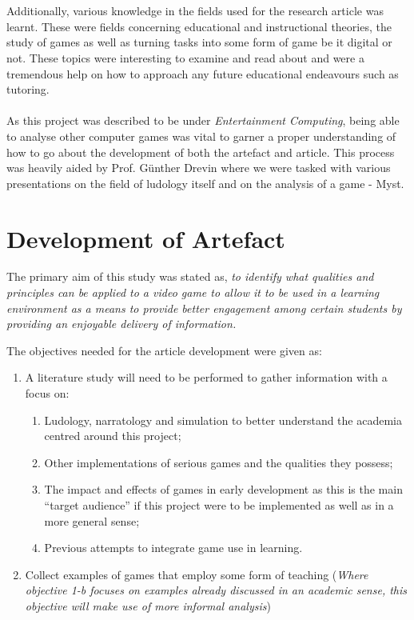 \\\\
Additionally, various knowledge in the fields used for the research article was learnt. These were fields concerning educational and instructional theories, the study of games as well as turning tasks into some form of game be it digital or not. These topics were interesting to examine and read about and were a tremendous help on how to approach any future educational endeavours such as tutoring. 
\\\\
As this project was described to be under \textit{Entertainment Computing}, being able to analyse other computer games was vital to garner a proper understanding of how to go about the development of both the artefact and article. This process was heavily aided by Prof. Günther Drevin where we were tasked with various presentations on the field of ludology itself and on the analysis of a game - Myst.

\section{Development of Artefact}
The primary aim of this study was stated as, \textit{to identify what qualities and principles can be applied to a video game to allow it to be used in a learning environment as a means to provide better engagement among certain students by providing an enjoyable delivery of information.}

The objectives needed for the article development were given as:
\begin{enumerate}
\item A literature study will need to be performed to gather information with a focus on:
\begin{enumerate}
\item Ludology, narratology and simulation to better understand the academia centred around this project;
\item Other implementations of serious games and the qualities they possess;
\item The impact and effects of games in early development as this is the main “target audience” if this project were to be implemented as well as in a more general sense;
\item Previous attempts to integrate game use in learning.
\end{enumerate}
\item Collect examples of games that employ some form of teaching 
(\textit{Where objective 1-b focuses on examples already discussed in an academic sense, this objective will make use of more informal analysis})
\end{enumerate}

